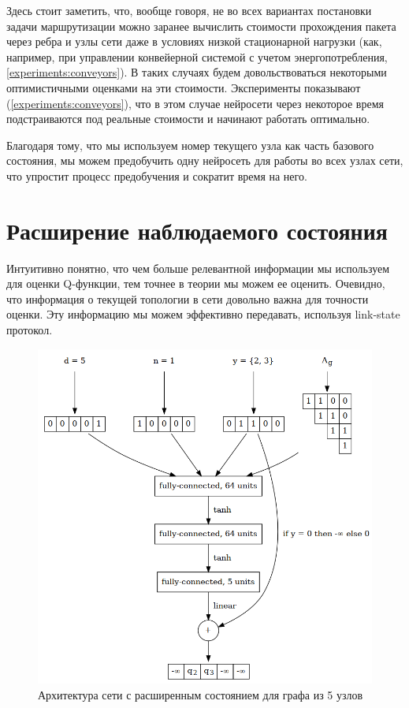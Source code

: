 \documentclass[specification, annotation]{itmo-student-thesis}
\begin{document}
Здесь стоит заметить, что, вообще говоря, не во всех вариантах постановки задачи
маршрутизации можно заранее вычислить стоимости прохождения пакета через ребра и
узлы сети даже в условиях низкой стационарной нагрузки (как, например, при
управлении конвейерной системой с учетом энергопотребления,
\ref{experiments:conveyors}). В таких случаях будем довольствоваться некоторыми
оптимистичными оценками на эти стоимости. Эксперименты показывают
(\ref{experiments:conveyors}), что в этом случае нейросети через некоторое время
подстраиваются под реальные стоимости и начинают работать оптимально.

Благодаря тому, что мы используем номер текущего узла как часть базового
состояния, мы можем предобучить одну нейросеть для работы во всех узлах сети,
что упростит процесс предобучения и сократит время на него.

\section{Расширение наблюдаемого состояния}

Интуитивно понятно, что чем больше релевантной информации мы используем для
оценки Q-функции, тем точнее в теории мы можем ее оценить. Очевидно, что
информация о текущей топологии в сети довольно важна для точности оценки. Эту
информацию мы можем эффективно передавать, используя link-state протокол.

\begin{figure}[!h]
  \caption{Архитектура сети с расширенным состоянием для графа из 5 узлов}\label{nn-pic-2}
  \centering
  \includegraphics[scale=0.5]{nn-2}
\end{figure}
\end{document}
